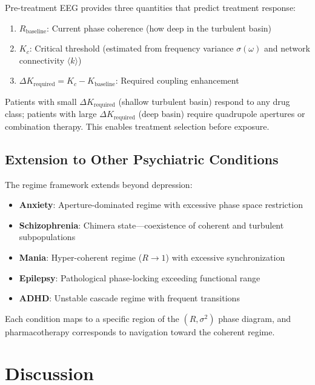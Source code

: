 \documentclass[twocolumn,10pt]{article}
\theoremstyle{remark}
\newcommand{\Rorder}{R}
\begin{document}
Pre-treatment EEG provides three quantities that predict treatment response:
\begin{enumerate}[nosep]
  \item $\Rorder_{\mathrm{baseline}}$: Current phase coherence (how deep in the turbulent basin)
  \item $K_c$: Critical threshold (estimated from frequency variance $\sigma(\omega)$ and network connectivity $\langle k \rangle$)
  \item $\Delta K_{\mathrm{required}} = K_c - K_{\mathrm{baseline}}$: Required coupling enhancement
\end{enumerate}

Patients with small $\Delta K_{\mathrm{required}}$ (shallow turbulent basin) respond to any drug class; patients with large $\Delta K_{\mathrm{required}}$ (deep basin) require quadrupole apertures or combination therapy. This enables treatment selection before exposure.

\subsection{Extension to Other Psychiatric Conditions}

The regime framework extends beyond depression:
\begin{itemize}[nosep]
  \item \textbf{Anxiety}: Aperture-dominated regime with excessive phase space restriction~\citep{uhlhaas2006neural}
  \item \textbf{Schizophrenia}: Chimera state---coexistence of coherent and turbulent subpopulations~\citep{panaggio2015chimera,uhlhaas2010neural}
  \item \textbf{Mania}: Hyper-coherent regime ($\Rorder \to 1$) with excessive synchronization
  \item \textbf{Epilepsy}: Pathological phase-locking exceeding functional range
  \item \textbf{ADHD}: Unstable cascade regime with frequent transitions
\end{itemize}

Each condition maps to a specific region of the $(\Rorder, \sigma^2)$ phase diagram, and pharmacotherapy corresponds to navigation toward the coherent regime.

\section{Discussion}
\label{sec:discussion}
\end{document}
